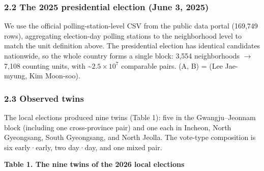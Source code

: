 \documentclass[
  11pt,
]{article}
\begin{document}
\subsubsection{2.2 The 2025 presidential election (June 3,
2025)}\label{the-2025-presidential-election-june-3-2025}

We use the official polling-station-level CSV from the public data
portal (169,749 rows), aggregating election-day polling stations to the
neighborhood level to match the unit definition above. The presidential
election has identical candidates nationwide, so the whole country forms
a single block: 3,554 neighborhoods \(\to\) 7,108 counting units, with
\textasciitilde{}\(2.5 \times 10^{7}\) comparable pairs. (A, B) = (Lee
Jae-myung, Kim Moon-soo).

\subsubsection{2.3 Observed twins}\label{observed-twins}

The local elections produced nine twins (Table 1): five in the
Gwangju--Jeonnam block (including one cross-province pair) and one each
in Incheon, North Gyeongsang, South Gyeongsang, and North Jeolla. The
vote-type composition is six early·early, two day·day, and one mixed
pair.

\textbf{Table 1. The nine twins of the 2026 local elections}
\end{document}

